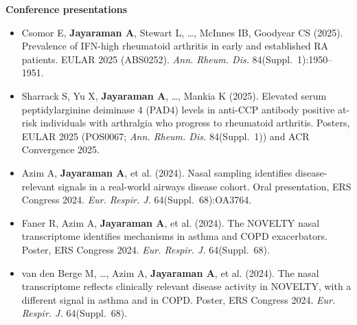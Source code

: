 \documentclass[letterpaper,11pt]{article}
\begin{document}
\textbf{Conference presentations}
\begin{itemize}
  \item Csomor E, \textbf{Jayaraman A}, Stewart L, \ldots, McInnes IB, Goodyear CS (2025). Prevalence of IFN-high rheumatoid arthritis in early and established RA patients. EULAR 2025 (ABS0252). \textit{Ann. Rheum. Dis.} 84(Suppl.~1):1950--1951.
  \item Sharrack S, Yu X, \textbf{Jayaraman A}, \ldots, Mankia K (2025). Elevated serum peptidylarginine deiminase 4 (PAD4) levels in anti-CCP antibody positive at-risk individuals with arthralgia who progress to rheumatoid arthritis. Posters, EULAR 2025 (POS0067; \textit{Ann. Rheum. Dis.} 84(Suppl.~1)) and ACR Convergence 2025.
  \item Azim A, \textbf{Jayaraman A}, et al. (2024). Nasal sampling identifies disease-relevant signals in a real-world airways disease cohort. Oral presentation, ERS Congress 2024. \textit{Eur. Respir. J.} 64(Suppl.~68):OA3764.
  \item Faner R, Azim A, \textbf{Jayaraman A}, et al. (2024). The NOVELTY nasal transcriptome identifies mechanisms in asthma and COPD exacerbators. Poster, ERS Congress 2024. \textit{Eur. Respir. J.} 64(Suppl.~68).
  \item van den Berge M, \ldots, Azim A, \textbf{Jayaraman A}, et al. (2024). The nasal transcriptome reflects clinically relevant disease activity in NOVELTY, with a different signal in asthma and in COPD. Poster, ERS Congress 2024. \textit{Eur. Respir. J.} 64(Suppl.~68).
\end{itemize}

\par\endgroup
\end{document}
